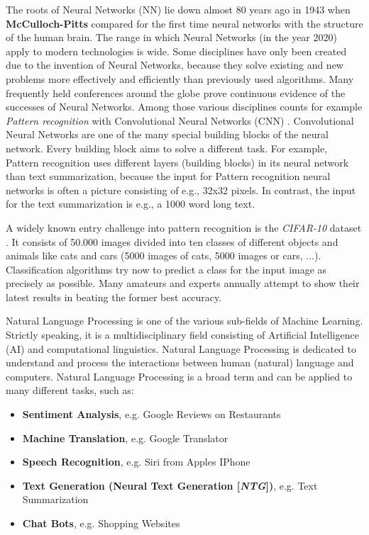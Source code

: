 The roots of Neural Networks (NN) lie down almost 80 years ago in 1943 when \textbf{McCulloch-Pitts} \cite{NN} compared for the first time neural networks with the structure of the human brain. The range in which Neural Networks (in the year 2020) apply to modern technologies is wide. Some disciplines have only been created due to the invention of Neural Networks, because they solve existing and new problems more effectively and efficiently than previously used algorithms. Many frequently held conferences around the globe prove continuous evidence of the successes of Neural Networks. Among those various disciplines counts for example \textit{Pattern recognition} with Convolutional Neural Networks (CNN) \cite{cnn}. Convolutional Neural Networks are one of the many special building blocks of the neural network. Every building block aims to solve a different task. For example, Pattern recognition uses different layers (building blocks) in its neural network than text summarization, because the input for Pattern recognition neural networks is often a picture consisting of e.g., 32x32 pixels. In contrast, the input for the text summarization is e.g., a 1000 word long text.  

A widely known entry challenge into pattern recognition is the \textit{CIFAR-10} dataset \cite{cifar}. It consists of 50.000 images divided into ten classes of different objects and animals like cats and cars (5000 images of cats, 5000 images or cars, ...). Classification algorithms try now to predict a class for the input image as precisely as possible. Many amateurs \cite{tim} and experts annually attempt to show their latest results in beating the former best accuracy. 

Natural Language Processing is one of the various sub-fields of Machine Learning. Strictly speaking, it is a multidisciplinary field consisting of Artificial Intelligence (AI) and computational linguistics. Natural Language Processing is dedicated to understand and process the interactions between human (natural) language and computers. Natural Language Processing is a broad term and can be applied to many different tasks, such as: 

\begin{itemize}
\item \textbf{Sentiment Analysis}, e.g. Google Reviews on Restaurants
\item \textbf{Machine Translation}, e.g. Google Translator
\item \textbf{Speech Recognition}, e.g. Siri from Apples IPhone
\item \textbf{Text Generation (Neural Text Generation [\textit{NTG}])}, e.g. Text Summarization
\item \textbf{Chat Bots}, e.g. Shopping Websites
\end{itemize}

